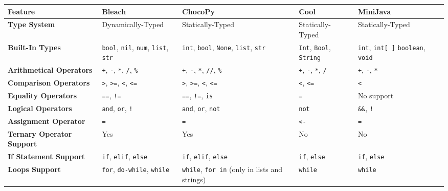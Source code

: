 \begin{table}[h!]
    \centering
    \begin{tabular}{|p{3.2cm}|p{3cm}|p{3cm}|p{3cm}|p{3cm}|p{3cm}|}
        \hline
        \textbf{Feature} & \textbf{Bleach} & \textbf{ChocoPy} & \textbf{Cool} & \textbf{MiniJava} \\  %
        \hline
        \textbf{Type System} & Dynamically-Typed & Statically-Typed & Statically-Typed & Statically-Typed \\  %
        \hline
        \textbf{Built-In Types} & \texttt{bool}, \texttt{nil}, \texttt{num}, \newline \texttt{list}, \texttt{str} & \texttt{int}, \texttt{bool}, \texttt{None}, \texttt{list}, \texttt{str} & \texttt{Int}, \texttt{Bool}, \texttt{String} & \texttt{int}, \texttt{int[ ]} \texttt{boolean}, \texttt{void} \\
        \hline
        \textbf{Arithmetical Operators} & \texttt{+}, \texttt{-}, \texttt{*}, \texttt{/}, \texttt{\%} & \texttt{+}, \texttt{-}, \texttt{*}, \texttt{//}, \texttt{\%} & \texttt{+}, \texttt{-}, \texttt{*}, \texttt{/} & \texttt{+}, \texttt{-}, \texttt{*} \\
        \hline
        \textbf{Comparison Operators} & \texttt{>}, \texttt{>=}, \texttt{<}, \texttt{<=} & \texttt{>}, \texttt{>=}, \texttt{<}, \texttt{<=} & \texttt{<}, \texttt{<=} & \texttt{<} \\
        \hline
        \textbf{Equality Operators} & \texttt{==}, \texttt{!=} & \texttt{==}, \texttt{!=}, \texttt{is} & \texttt{=} & No support \\
        \hline
        \textbf{Logical Operators} & \texttt{and}, \texttt{or}, \texttt{!} & \texttt{and}, \texttt{or}, \texttt{not} & \texttt{not} & \texttt{\&\&}, \texttt{!} \\
        \hline
        \textbf{Assignment Operator} & \texttt{=} & \texttt{=} & \texttt{<-} & \texttt{=} \\
        \hline
        \textbf{Ternary Operator Support} & Yes & Yes & No & No \\
        \hline
        \textbf{If Statement Support} & \texttt{if}, \texttt{elif}, \texttt{else} & \texttt{if}, \texttt{elif}, \texttt{else} & \texttt{if}, \texttt{else} & \texttt{if}, \texttt{else} \\
        \hline
        \textbf{Loops Support} & \texttt{for}, \texttt{do-while}, \texttt{while} & \texttt{while}, \texttt{for in} (only in lists and strings) & \texttt{while} & \texttt{while} \\

\end{tabular}
\end{table}
